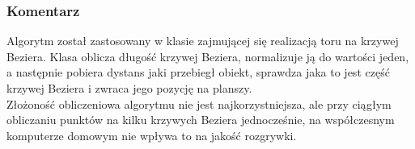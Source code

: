 		\subsubsection{Komentarz}
			\indent \indent Algorytm został zastosowany w klasie zajmującej się realizacją toru na krzywej Beziera. Klasa oblicza długość krzywej Beziera, normalizuje ją do wartości jeden, a następnie pobiera dystans jaki przebiegł obiekt, sprawdza jaka to jest część krzywej Beziera i zwraca jego pozycję na planszy.\\
			\indent Złożoność obliczeniowa algorytmu nie jest najkorzystniejsza, ale przy ciągłym obliczaniu punktów na kilku krzywych Beziera jednocześnie, na współczesnym komputerze domowym nie wpływa to na jakość rozgrywki.
			